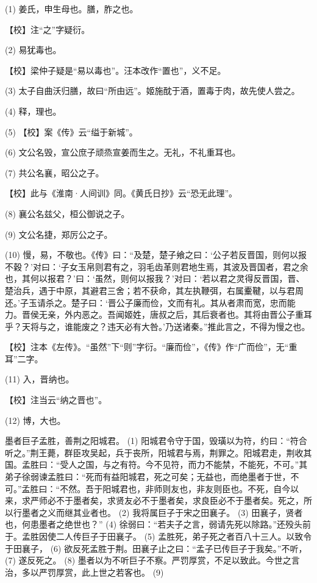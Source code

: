\documentclass[12pt,UTF8]{ctexbook}
\begin{document}
(1) 姜氏，申生母也。膳，胙之也。

【校】注“之”字疑衍。

(2) 易犹毒也。

【校】梁仲子疑是“易以毒也”。汪本改作“置也”，义不足。

(3) 太子自曲沃归膳，故曰“所由远”。姬施酖于酒，置毒于肉，故先使人尝之。

(4) 释，理也。

(5) 【校】案《传》云“缢于新城”。

(6) 文公名毁，宣公庶子顽烝宣姜而生之。无礼，不礼重耳也。

(7) 共公名襄，昭公之子。

【校】此与《淮南·人间训》同。《黄氏日抄》云“恐无此理”。

(8) 襄公名兹父，桓公御说之子。

(9) 文公名捷，郑厉公之子。

(10) 慢，易，不敬也。《传》曰：“及楚，楚子飨之曰：‘公子若反晋国，则何以报不穀？’对曰：‘子女玉帛则君有之，羽毛齿革则君地生焉，其波及晋国者，君之余也，其何以报君？’曰：‘虽然，则何以报我？’对曰：‘若以君之灵得反晋国，晋、楚治兵，遇于中原，其避君三舍；若不获命，其左执鞭弭，右属櫜鞬，以与君周还。’子玉请杀之。楚子曰：‘晋公子廉而俭，文而有礼。其从者肃而宽，忠而能力。晋侯无亲，外内恶之。吾闻姬姓，唐叔之后，其后衰者也。其将由晋公子重耳乎？天将与之，谁能废之？违天必有大咎。’乃送诸秦。”推此言之，不得为慢之也。

【校】注本《左传》。“虽然”下“则”字衍。“廉而俭”，《传》作“广而俭”，无“重耳”二字。

(11) 入，晋纳也。

【校】注当云“纳之晋也”。

(12) 博，大也。

墨者巨子孟胜，善荆之阳城君。 (1) 阳城君令守于国，毁璜以为符，约曰：“符合听之。”荆王薨，群臣攻吴起，兵于丧所，阳城君与焉，荆罪之。阳城君走，荆收其国。孟胜曰：“受人之国，与之有符。今不见符，而力不能禁，不能死，不可。”其弟子徐弱谏孟胜曰：“死而有益阳城君，死之可矣；无益也，而绝墨者于世，不可。”孟胜曰：“不然。吾于阳城君也，非师则友也，非友则臣也。不死，自今以来，求严师必不于墨者矣，求贤友必不于墨者矣，求良臣必不于墨者矣。死之，所以行墨者之义而继其业者也。 (2) 我将属巨子于宋之田襄子。 (3) 田襄子，贤者也，何患墨者之绝世也？” (4) 徐弱曰：“若夫子之言，弱请先死以除路。”还殁头前于。孟胜因使二人传巨子于田襄子。 (5) 孟胜死，弟子死之者百八十三人。以致令于田襄子， (6) 欲反死孟胜于荆。田襄子止之曰：“孟子已传巨子于我矣。”不听， (7) 遂反死之。 (8) 墨者以为不听巨子不察。严罚厚赏，不足以致此。今世之言治，多以严罚厚赏，此上世之若客也。 (9)
\end{document}
